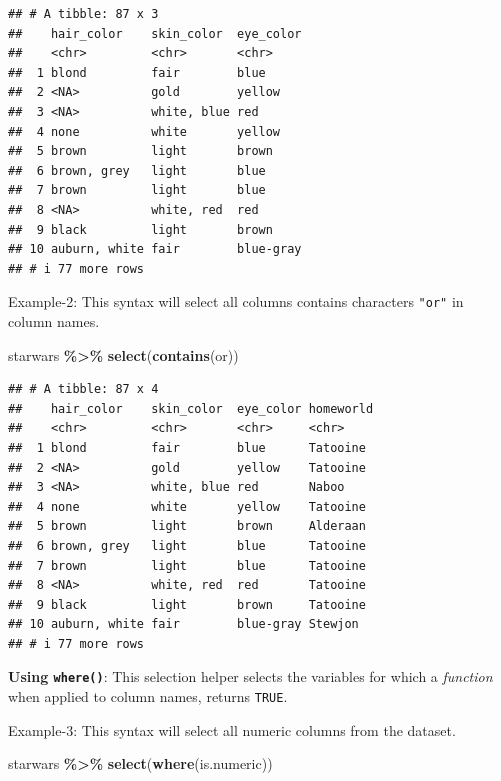 \documentclass[
]{book}
\newenvironment{Shaded}{\begin{snugshade}}{\end{snugshade}}
\newcommand{\FunctionTok}[1]{\textcolor[rgb]{0.13,0.29,0.53}{\textbf{#1}}}
\newcommand{\NormalTok}[1]{#1}
\newcommand{\SpecialCharTok}[1]{\textcolor[rgb]{0.81,0.36,0.00}{\textbf{#1}}}
\newcommand{\StringTok}[1]{\textcolor[rgb]{0.31,0.60,0.02}{#1}}
\begin{document}
\begin{verbatim}
## # A tibble: 87 x 3
##    hair_color    skin_color  eye_color
##    <chr>         <chr>       <chr>    
##  1 blond         fair        blue     
##  2 <NA>          gold        yellow   
##  3 <NA>          white, blue red      
##  4 none          white       yellow   
##  5 brown         light       brown    
##  6 brown, grey   light       blue     
##  7 brown         light       blue     
##  8 <NA>          white, red  red      
##  9 black         light       brown    
## 10 auburn, white fair        blue-gray
## # i 77 more rows
\end{verbatim}

Example-2: This syntax will select all columns contains characters \texttt{"or"} in column names.

\begin{Shaded}
\begin{Highlighting}[]
\NormalTok{starwars }\SpecialCharTok{\%\textgreater{}\%} 
  \FunctionTok{select}\NormalTok{(}\FunctionTok{contains}\NormalTok{(}\StringTok{\textquotesingle{}or\textquotesingle{}}\NormalTok{))}
\end{Highlighting}
\end{Shaded}

\begin{verbatim}
## # A tibble: 87 x 4
##    hair_color    skin_color  eye_color homeworld
##    <chr>         <chr>       <chr>     <chr>    
##  1 blond         fair        blue      Tatooine 
##  2 <NA>          gold        yellow    Tatooine 
##  3 <NA>          white, blue red       Naboo    
##  4 none          white       yellow    Tatooine 
##  5 brown         light       brown     Alderaan 
##  6 brown, grey   light       blue      Tatooine 
##  7 brown         light       blue      Tatooine 
##  8 <NA>          white, red  red       Tatooine 
##  9 black         light       brown     Tatooine 
## 10 auburn, white fair        blue-gray Stewjon  
## # i 77 more rows
\end{verbatim}

\textbf{Using \texttt{where()}}: This selection helper selects the variables for which a \emph{function} when applied to column names, returns \texttt{TRUE}.

Example-3: This syntax will select all numeric columns from the dataset.

\begin{Shaded}
\begin{Highlighting}[]
\NormalTok{starwars }\SpecialCharTok{\%\textgreater{}\%} 
  \FunctionTok{select}\NormalTok{(}\FunctionTok{where}\NormalTok{(is.numeric))}
\end{Highlighting}
\end{Shaded}
\end{document}
